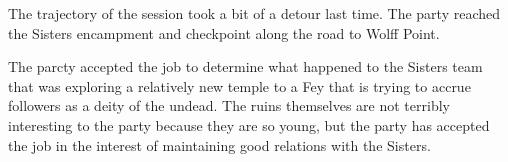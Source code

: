 The trajectory of the session took a bit of a detour last time.
The party reached the Sisters encampment and checkpoint along the road to Wolff Point.

The parcty accepted the job to determine what happened to the Sisters team that was exploring a relatively new temple to a Fey that is trying to accrue followers as a deity of the undead.
The ruins themselves are not terribly interesting to the party because they are so young, but the party has accepted the job in the interest of maintaining good relations with the Sisters.
